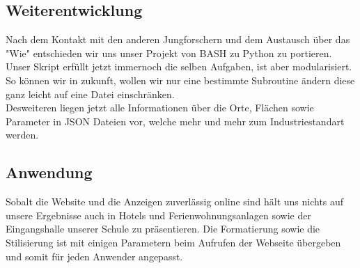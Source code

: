 \documentclass[a4paper,oneside,12pt,titlepage]{article}
\begin{document}
\subsection{Weiterentwicklung}
Nach dem Kontakt mit den anderen Jungforschern und dem Austausch über das "Wie" entschieden wir uns unser Projekt von BASH zu Python zu portieren. Unser Skript erfüllt jetzt immernoch die selben Aufgaben, ist aber modularisiert. So können wir in zukunft, wollen wir nur eine bestimmte Subroutine ändern diese ganz leicht auf eine Datei einschränken.\\Desweiteren liegen jetzt alle Informationen über die Orte, Flächen sowie Parameter in JSON Dateien vor, welche mehr und mehr zum Industriestandart werden.
\subsection{Anwendung}
Sobalt die Website und die Anzeigen zuverlässig online sind hält uns nichts auf unsere Ergebnisse auch in Hotels und Ferienwohnungsanlagen sowie der Eingangshalle unserer Schule zu präsentieren. Die Formatierung sowie die Stilisierung ist mit einigen Parametern beim Aufrufen der Webseite übergeben und somit für jeden Anwender angepasst.

%



\newpage
\end{document}
